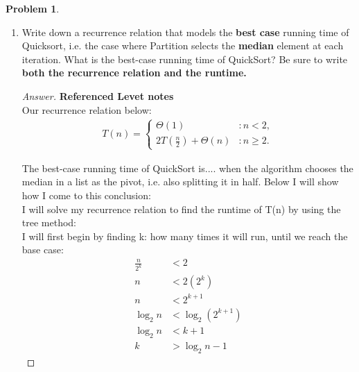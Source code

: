 \documentclass[11pt]{article}
\theoremstyle{definition}
\theoremstyle{definition}
\newtheorem{required}{Problem}
\theoremstyle{definition}
\begin{document}
\begin{required} \label{unrolling}
\begin{enumerate}[label=(\alph*)]
\subsection{Part \ref{S20a}}

\item \label{S20a} Write down a recurrence relation that models the {\bf best case} running time of Quicksort, i.e. the case where {\sc Partition} selects the {\bf median} element at each iteration. What is the best-case running time of QuickSort? Be sure to write \textbf{both the recurrence relation and the runtime.}

\begin{proof}[Answer] \textbf{Referenced Levet notes} \\
Our recurrence relation below: \\
\begin{align*}
T(n) = \begin{cases}
\Theta(1) & : n < 2, \\
2T(\frac{n}{2}) + \Theta(n) & : n \geq 2.
\end{cases}
\end{align*}

The best-case running time of QuickSort is.... when the algorithm chooses the median in a list as the pivot, i.e. also splitting it in half. Below I will show how I come to this conclusion: \\

I will solve my recurrence relation to find the runtime of T(n) by using the tree method: \\
I will first begin by finding k: how many times it will run, until we reach the base case: \\
\begin{align*}
\frac{n}{2^k} &< 2 \\
n&< 2(2^k) \\
n &< 2^{k+1} \\
\log_2 n &< \log_2 (2^{k+1})  \\
\log_2 n &< k + 1 \\
k &> \log_2 n - 1
\end{align*}


\end{proof}
\end{enumerate}
\end{required}
\end{document}

